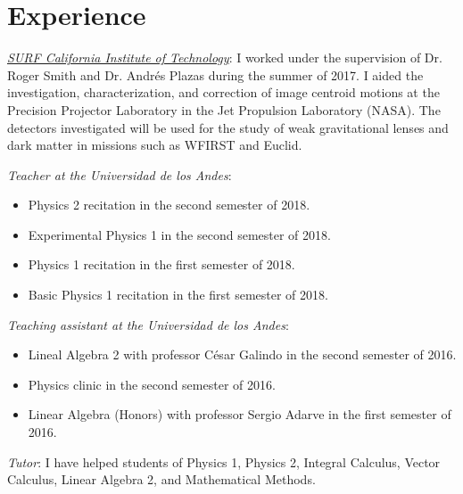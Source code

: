 \documentclass[line,margin]{res}
\begin{document}
\begin{resume}
\begin{itemize}
\end{itemize}

\section{Experience}

\href{http://sfp.caltech.edu/documents/722-abstracts_a-z_jan_2018_update_-_with_cover_for_web_site.pdf}{\sl SURF California Institute of Technology}: I worked under the supervision of Dr. Roger Smith and Dr. Andrés Plazas during the summer of 2017. I aided the investigation, characterization, and correction of image centroid motions at the Precision Projector Laboratory in the Jet Propulsion Laboratory (NASA). The detectors investigated will be used for the study of weak gravitational lenses and dark matter in missions such as WFIRST and Euclid.

{\sl Teacher at the Universidad de los Andes}:
\begin{itemize}

\item Physics 2 recitation in the second semester of 2018.

\item Experimental Physics 1 in the second semester of 2018.

\item Physics 1 recitation in the first semester of 2018.

\item Basic Physics 1 recitation in the first semester of 2018.

\end{itemize}

{\sl Teaching assistant at the Universidad de los Andes}: 
\begin{itemize}

\item Lineal Algebra 2 with professor César Galindo in the second semester of 2016.

\item Physics clinic in the second semester of 2016.

\item Linear Algebra (Honors) with professor Sergio Adarve in the first semester of 2016.

\end{itemize}
  
{\sl Tutor}: I have helped students of Physics 1, Physics 2, Integral Calculus, Vector Calculus, Linear Algebra 2, and Mathematical Methods.


\end{resume}
\end{document}
